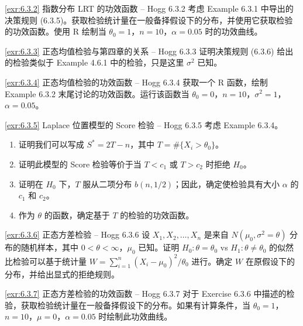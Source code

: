 
\begin{exercise}{\ref{exr:6.3.2} 指数分布 LRT 的功效函数 – Hogg 6.3.2}\label{exr:6.3.2}
考虑 Example 6.3.1 中导出的决策规则 (6.3.5)。获取检验统计量在一般备择假设下的分布，并使用它获取检验的功效函数。使用 R 绘制当 $\theta_0=1$，$n=10$，$\alpha=0.05$ 时的功效曲线。
\end{exercise}

\begin{exercise}{\ref{exr:6.3.3} 正态均值检验与第四章的关系 – Hogg 6.3.3}\label{exr:6.3.3}
证明决策规则 (6.3.6) 给出的检验类似于 Example 4.6.1 中的检验，只是这里 $\sigma^2$ 已知。
\end{exercise}

\begin{exercise}{\ref{exr:6.3.4} 正态均值检验的功效函数 – Hogg 6.3.4}\label{exr:6.3.4}
获取一个 R 函数，绘制 Example 6.3.2 末尾讨论的功效函数。运行该函数当 $\theta_0=0$，$n=10$，$\sigma^2=1$，$\alpha=0.05$。
\end{exercise}

\begin{exercise}{\ref{exr:6.3.5} Laplace 位置模型的 Score 检验 – Hogg 6.3.5}\label{exr:6.3.5}
考虑 Example 6.3.4。

\begin{enumerate}
\item[(a)] 证明我们可以写成 $S^* = 2T - n$，其中 $T = \#\{X_i > \theta_0\}$。
\item[(b)] 证明此模型的 Score 检验等价于当 $T < c_1$ 或 $T > c_2$ 时拒绝 $H_0$。
\item[(c)] 证明在 $H_0$ 下，$T$ 服从二项分布 $b(n,1/2)$；因此，确定使检验具有大小 $\alpha$ 的 $c_1$ 和 $c_2$。
\item[(d)] 作为 $\theta$ 的函数，确定基于 $T$ 的检验的功效函数。
\end{enumerate}
\end{exercise}

\begin{exercise}{\ref{exr:6.3.6} 正态方差检验 – Hogg 6.3.6}\label{exr:6.3.6}
设 $X_1, X_2, \ldots, X_n$ 是来自 $N(\mu_0, \sigma^2=\theta)$ 分布的随机样本，其中 $0 < \theta < \infty$，$\mu_0$ 已知。证明 $H_0: \theta=\theta_0$ vs $H_1: \theta \neq \theta_0$ 的似然比检验可以基于统计量 $W = \sum_{i=1}^n (X_i-\mu_0)^2/\theta_0$ 进行。确定 $W$ 在原假设下的分布，并给出显式的拒绝规则。
\end{exercise}

\begin{exercise}{\ref{exr:6.3.7} 正态方差检验的功效函数 – Hogg 6.3.7}\label{exr:6.3.7}
对于 Exercise 6.3.6 中描述的检验，获取检验统计量在一般备择假设下的分布。如果有计算条件，当 $\theta_0=1$，$n=10$，$\mu=0$，$\alpha=0.05$ 时绘制此功效曲线。
\end{exercise}

